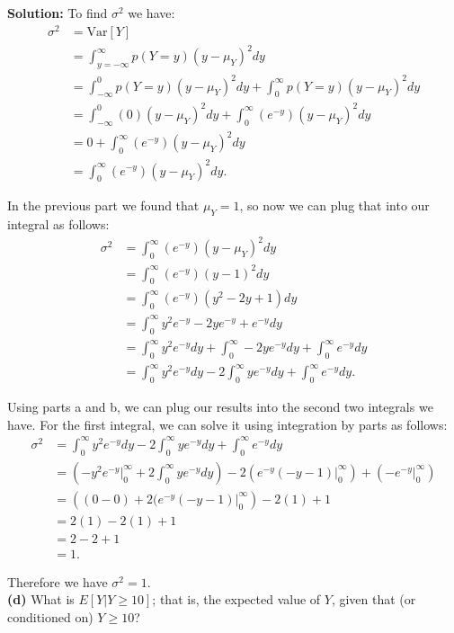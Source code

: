 \documentclass[a4paper]{article}
\begin{document}
\textbf{Solution:} To find $\sigma^2$ we have:
\begin{align*}
  \sigma^2 &= \text{Var}[Y]\\
  &= \int_{y=-\infty}^\infty p(Y=y) (y - \mu_Y)^2 dy\\
  &= \int_{-\infty}^0 p(Y=y) (y - \mu_Y)^2 dy + \int_{0}^\infty p(Y=y) (y - \mu_Y)^2 dy\\
  &= \int_{-\infty}^0 (0) (y - \mu_Y)^2 dy + \int_{0}^\infty (e^{-y}) (y - \mu_Y)^2 dy\\
  &= 0 + \int_{0}^\infty (e^{-y}) (y - \mu_Y)^2 dy\\
  &= \int_{0}^\infty (e^{-y}) (y - \mu_Y)^2 dy.
\end{align*}

In the previous part we found that $\mu_Y = 1$, so now we can plug that into our integral as follows:
\begin{align*}
  \sigma^2 &= \int_{0}^\infty (e^{-y}) (y - \mu_Y)^2 dy\\
  &= \int_{0}^\infty (e^{-y}) (y - 1)^2 dy\\
  &= \int_{0}^\infty (e^{-y}) (y^2 -2y + 1) dy\\
  &= \int_{0}^\infty y^2e^{-y} -2ye^{-y} + e^{-y} dy\\
  &= \int_{0}^\infty y^2e^{-y}dy + \int_{0}^\infty-2ye^{-y}dy + \int_{0}^\infty e^{-y} dy\\
  &= \int_{0}^\infty y^2e^{-y}dy -2 \int_{0}^\infty ye^{-y}dy + \int_{0}^\infty e^{-y} dy.
\end{align*}

Using parts a and b, we can plug our results into the second two integrals we have.  For the first integral, we can 
solve it using integration by parts as follows:
\begin{align*}
  \sigma^2 &= \int_{0}^\infty y^2e^{-y}dy -2 \int_{0}^\infty ye^{-y}dy + \int_{0}^\infty e^{-y} dy\\
  &= \left(-y^2e^{-y} \Big|_0^\infty + 2\int_{0}^\infty ye^{-y}dy \right) -2 \left(e^{-y} (-y-1) \Big|_0^\infty \right) + \left(-e^{-y} \Big|_0^\infty\right)\\
  &= \left((0 - 0) + 2 (e^{-y} (-y-1) \Big|_0^\infty \right) -2 (1) + 1\\
  &= 2(1) -2(1) + 1\\
  &= 2 - 2 + 1\\
  &= 1.
\end{align*}

Therefore we have $\sigma^2 = 1$.\\
\textbf{(d)} What is $E[Y | Y \geq 10]$; that is, the expected value of $Y$, given that (or conditioned 
on) $Y \geq 10$?
\end{document}
